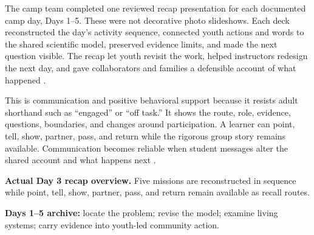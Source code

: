 
\vspace{-0.5cm}

The camp team completed one reviewed recap presentation for each documented camp day, Days 1--5. These were not decorative photo slideshows. Each deck reconstructed the day's activity sequence, connected youth actions and words to the shared scientific model, preserved evidence limits, and made the next question visible. The recap let youth revisit the work, helped instructors redesign the next day, and gave collaborators and families a defensible account of what happened \citep{campEvidence2026}.

This is communication and positive behavioral support because it resists adult shorthand such as ``engaged'' or ``off task.'' It shows the route, role, evidence, questions, boundaries, and changes around participation. A learner can point, tell, show, partner, pass, and return while the rigorous group story remains available. Communication becomes reliable when student messages alter the shared account and what happens next \citep{peckhamhardin2015behavior}.


\begin{center}

  \vspace{0.015in}
  \parbox{0.94\textwidth}{\centering\scriptsize\textbf{Actual Day 3 recap overview.} Five missions are reconstructed in sequence while point, tell, show, partner, pass, and return remain available as recall routes.}

  \vspace{0.04in}

  \vspace{0.01in}
  \parbox{0.94\textwidth}{\centering\tiny\textbf{Days 1--5 archive:} locate the problem; revise the model; examine living systems; carry evidence into youth-led community action.}
\end{center}

